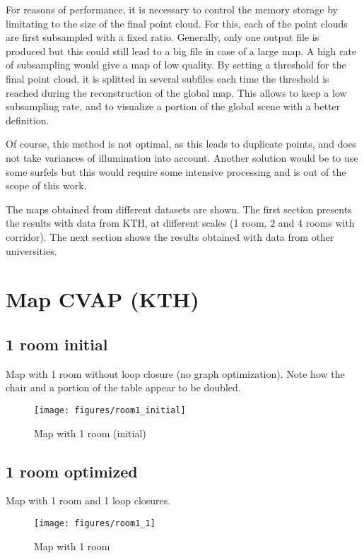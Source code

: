 For reasons of performance, it is necessary to control the memory storage by limitating to the size of the final point cloud. For this, each of the point clouds are first subsampled with a fixed ratio. Generally, only one output file is produced but this could still lead to a big file in case of a large map. A high rate of subsampling would give a map of low quality. By setting a threshold for the final point cloud, it is splitted in several subfiles each time the threshold is reached during the reconstruction of the global map. This allows to keep a low subsampling rate, and to visualize a portion of the global scene with a better definition.

Of course, this method is not optimal, as this leads to duplicate points, and does not take variances of illumination into account. Another solution would be to use some surfels \cite{IntelRGBD2010} but this would require some intensive processing and is out of the scope of this work.

The maps obtained from different datasets are shown. The first section presents the results with data from KTH, at different scales (1 room, 2 and 4 rooms with corridor). The next section shows the results obtained with data from other universities.

\section{Map CVAP (KTH)}

\subsection{1 room initial}
Map with 1 room without loop closure (no graph optimization). Note how the chair and a portion of the table appear to be doubled.

\begin{figure}[h!]
\centering
\texttt{[image: figures/room1\_initial]}
\caption{Map with 1 room (initial)}
\end{figure}

\subsection{1 room optimized}
Map with 1 room and 1 loop closures.

\begin{figure}[h!]
\centering
\texttt{[image: figures/room1\_1]}
\caption{Map with 1 room}
\end{figure}

